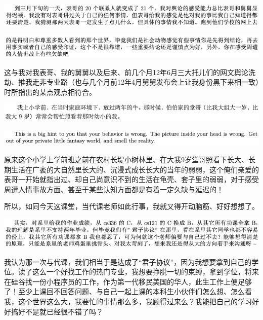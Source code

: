 \documentclass[9pt, b5paper]{article}
\begin{document}
\begin{center}
\includegraphics[width=.9\linewidth]{./pic/backups_plans_20210425_153712.png}
\end{center}

\begin{center}
\includegraphics[width=.9\linewidth]{./pic/backups_plans_20210425_153639.png}
\end{center}

这与我对我表哥、我的舅舅以及后来、前几个月12年6月三大托儿们的网文舆论洗劫、推我走非专业路（也与几个月前12年4月舅舅发布会上让我身份黑下来相一致）时所指出的某点观点相符合。

\begin{center}
\includegraphics[width=.9\linewidth]{./pic/backups_plans_20210425_154237.png}
\end{center}

\begin{center}
\includegraphics[width=.9\linewidth]{./pic/readme_20210425_160306.png}
\end{center}

原来这个小学上学前班之前在农村长堤小树林里、在大我9岁堂哥照看下长大、长期生活在广袤的大自然里长大的、沉浸式成长长大的当年的弱弱，这个俺们亲爱的表哥一开始就指出过、却自己尚意识不到的生活在龟壳、套子里的弱弱，对于感受周遭人情事故方面、甚至于某些认知方面都是有着一定久缺与延迟的！

所以，如同今天这课堂，当代课老师如此行事，我就又得开动脑筋、好好想想了。

\begin{center}
\includegraphics[width=.9\linewidth]{./pic/backups_plans_20210425_154431.png}
\end{center}

我认为那一次与代课，我们相当于是达成了“君子协议”，因为我想要拿到自己的学位。读了这么一个好找工作的热门专业，我想要挣脱一切的束缚，拿到学位，将来在硅谷找一份小程序员的工作，作为第一代移民美国的华人，此生工作上便足够了！至少上课回不回答问题、与自己一起上课的本科生小伙伴们怎么想、怎么看我，这个世界这么大，我要忙的事情那么多，我顾得过来么？我能把自己的学习好好搞好不是就已经很不错了吗？
\end{document}

